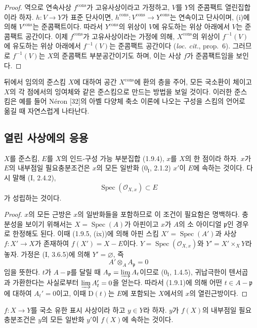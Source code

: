 \begin{proof}
역으로 연속사상 $f^{\mathrm{cons}}$가 고유사상이라고 가정하고,
$V$를 $Y$의 준콤팩트 열린집합이라 하자. $h:V\to Y$가 표준 단사이면,
$h^{\mathrm{cons}}:V^{\mathrm{cons}}\to Y^{\mathrm{cons}}$는 연속이고
단사이며, (i)에 의해 $V^{\mathrm{cons}}$는 준콤팩트이다. 따라서
$Y^{\mathrm{cons}}$의 위상이 $V$에 유도하는 위상 아래에서 $V$는
준콤팩트 공간이다. 이제 $f^{\mathrm{cons}}$가 고유사상이라는 가정에
의해, $X^{\mathrm{cons}}$의 위상이 $f^{-1}(V)$에 유도하는 위상
아래에서 $f^{-1}(V)$는 준콤팩트 공간이다 (\emph{loc. cit.}, prop.~6).
그러므로 $f^{-1}(V)$는 $X$의 준콤팩트 부분공간이기도 하며, 이는
사상 $f$가 준콤팩트임을 보인다.
\end{proof}

\begin{env}[1.9.16]
\label{IV.1.9.16-ko}
뒤에서 임의의 준스킴 $X$에 대하여 공간 $X^{\mathrm{cons}}$에 환의
층을 주어, 모든 국소환이 체이고 $X$의 각 점에서의 잉여체와 같은
준스킴으로 만드는 방법을 보일 것이다. 이러한 준스킴은 예를 들어
Néron [32]의 아벨 다양체 축소 이론에 나오는 구성을 스킴의 언어로
옮길 때 자연스럽게 나타난다.
\end{env}


\subsection{열린 사상에의 응용}
\label{subsection:IV.1.10-ko}

\begin{theorem}[1.10.1]
\label{IV.1.10.1-ko}
$X$를 준스킴, $E$를 $X$의 인드-구성 가능 부분집합 (1.9.4), $x$를
$X$의 한 점이라 하자. $x$가 $E$의 내부점일 필요충분조건은 $x$의
모든 일반화 ($0_{\mathrm I}$, 2.1.2) $x'$이 $E$에 속하는 것이다.
다시 말해 (I, 2.4.2),
\[
  \operatorname{Spec}(\mathcal O_{X,x})\subset E
\]
가 성립하는 것이다.
\end{theorem}

\begin{proof}
$x$의 모든 근방은 $x$의 일반화들을 포함하므로 이 조건이 필요함은
명백하다. 충분성을 보이기 위해서는 $X=\operatorname{Spec}(A)$가
아핀이고 $x$가 $A$의 소 아이디얼 $\mathfrak p$인 경우로 한정해도
된다. 이때 (1.9.5, (ix))에 의해 아핀 스킴
$X'=\operatorname{Spec}(A')$과 사상 $f:X'\to X$가 존재하여
$f(X')=X-E$이다. $Y=\operatorname{Spec}(\mathcal O_{X,x})$와
$Y'=X'\times_XY$라 놓자. 가정은 (I, 3.6.5)에 의해
$Y'=\varnothing$, 즉
\[
  A'\otimes_AA_{\mathfrak p}=0
\]
임을 뜻한다. $t$가 $A-\mathfrak p$를 달릴 때
$A_{\mathfrak p}=\varinjlim A_t$이므로 ($0_{\mathrm I}$, 1.4.5),
귀납극한이 텐서곱과 가환한다는 사실로부터
$\varinjlim A_t'=0$을 얻는다. 따라서 (1.9.1)에 의해 어떤
$t\in A-\mathfrak p$에 대하여 $A_t'=0$이고, 이때 $\mathrm D(t)$는
$E$에 포함되는 $X$에서의 $x$의 열린근방이다.
\end{proof}
\begin{corollary}[1.10.2]
\label{IV.1.10.2-ko}
$f:X\to Y$를 국소 유한 표시 사상이라 하고 $y\in Y$라 하자. $y$가
$f(X)$의 내부점일 필요충분조건은 $y$의 모든 일반화 $y'$이 $f(X)$에
속하는 것이다.
\end{corollary}

